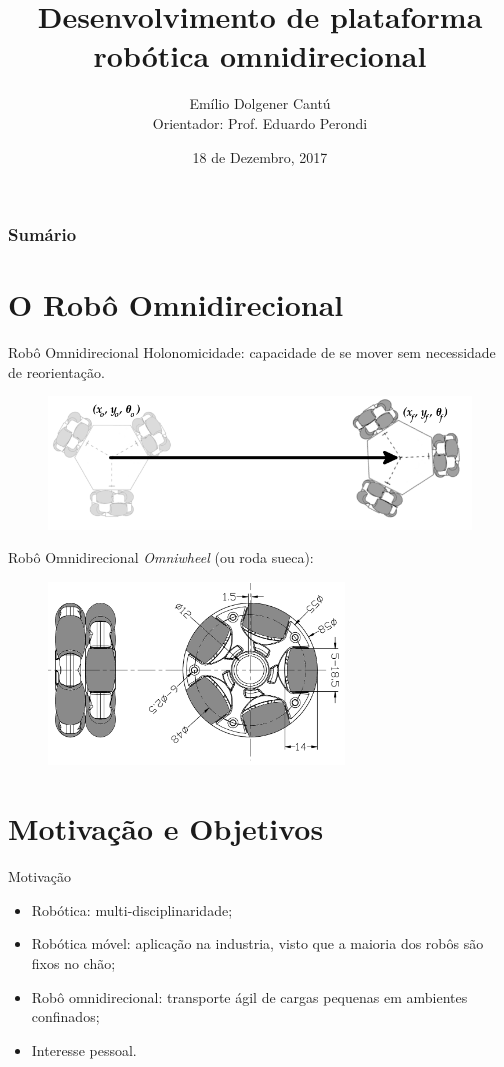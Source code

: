\documentclass{beamer}
\title{Desenvolvimento de plataforma robótica omnidirecional}
\date{18 de Dezembro, 2017}
\author{Emílio Dolgener Cantú \\ Orientador: Prof. Eduardo Perondi}
\institute{Universidade Federal do Rio Grande do Sul}
\begin{document}
\maketitle
\begin{frame}
  \frametitle{Sumário}
  \tableofcontents
\end{frame}
\section{O Robô Omnidirecional}
\begin{frame}{Robô Omnidirecional}
  Holonomicidade: capacidade de se mover sem necessidade de reorientação.
  \begin{figure}[h]
    \centering
    \includegraphics[width = \textwidth]{imagens/hibrida}
  \end{figure}
\end{frame}

\begin{frame}{Robô Omnidirecional}
  \emph{Omniwheel} (ou roda sueca):
  \begin{figure}[h]
    \centering
    \includegraphics[width = 0.7\textwidth]{imagens/omniwheel}
  \end{figure}
\end{frame}

\section{Motivação e Objetivos}
\begin{frame}{Motivação}
  \begin{itemize}
    \item{Robótica: multi-disciplinaridade;}
    \item{Robótica móvel: aplicação na industria, visto que a maioria dos robôs são fixos no chão;}
    \item{Robô omnidirecional: transporte ágil de cargas pequenas em ambientes confinados;}
    \item{Interesse pessoal.}
  \end{itemize}
\end{frame}
\end{document}
